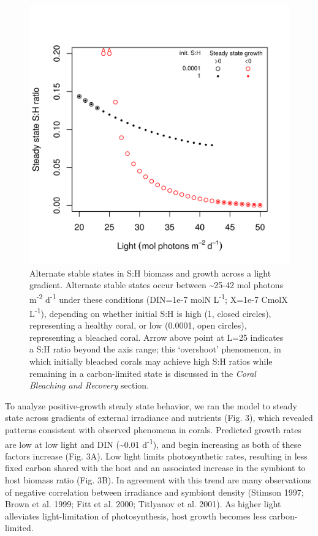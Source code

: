 \documentclass[]{elsarticle} %
\makeatletter
\def\maxwidth{\ifdim\Gin@nat@width>\linewidth\linewidth
\else\Gin@nat@width\fi}
\let\Oldincludegraphics\includegraphics
\renewcommand{\includegraphics}[1]{\Oldincludegraphics[width=\maxwidth]{#1}}
\makeatother
\begin{document}
\begin{figure}[htbp]
\centering
\includegraphics{../img/Fig2.png}
\caption{Alternate stable states in S:H biomass and growth across a
light gradient. Alternate stable states occur between
\textasciitilde{}25-42 mol photons m\textsuperscript{-2}
d\textsuperscript{-1} under these conditions (DIN=1e-7 molN
L\textsuperscript{-1}; X=1e-7 CmolX L\textsuperscript{-1}), depending on
whether initial S:H is high (1, closed circles), representing a healthy
coral, or low (0.0001, open circles), representing a bleached coral.
Arrow above point at L=25 indicates a S:H ratio beyond the axis range;
this `overshoot' phenomenon, in which initially bleached corals may
achieve high S:H ratios while remaining in a carbon-limited state is
discussed in the \emph{Coral Bleaching and Recovery} section.}
\end{figure}

To analyze positive-growth steady state behavior, we ran the model to
steady state across gradients of external irradiance and nutrients (Fig.
3), which revealed patterns consistent with observed phenomena in
corals. Predicted growth rates are low at low light and DIN
(\textasciitilde{}0.01 d\textsuperscript{-1}), and begin increasing as
both of these factors increase (Fig. 3A). Low light limits
photosynthetic rates, resulting in less fixed carbon shared with the
host and an associated increase in the symbiont to host biomass ratio
(Fig. 3B). In agreement with this trend are many observations of
negative correlation between irradiance and symbiont density (Stimson
1997; Brown et al. 1999; Fitt et al. 2000; Titlyanov et al. 2001). As
higher light alleviates light-limitation of photosynthesis, host growth
becomes less carbon-limited.
\end{document}
